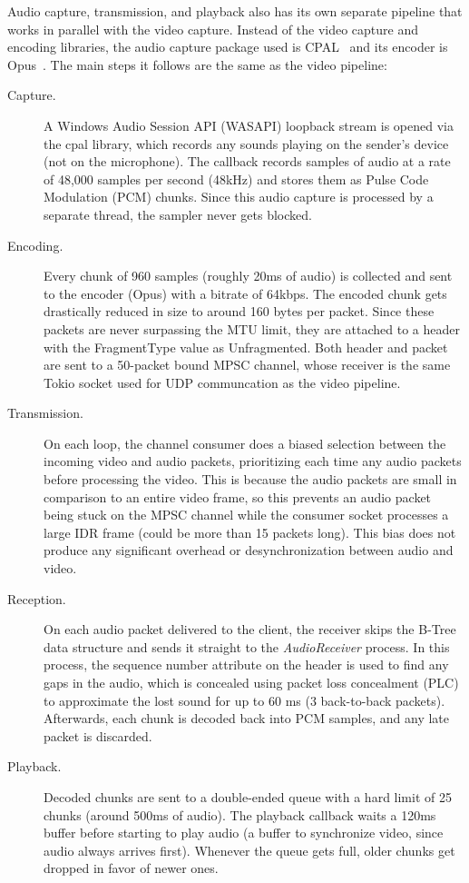 \documentclass{article}
\begin{document}
Audio capture, transmission, and playback also has its own separate pipeline that works in parallel with the video capture. Instead of the video capture and encoding libraries, the audio capture package used is CPAL~\cite{cpal} and its encoder is Opus~\cite{opus_rs}. The main steps it follows are the same as the video pipeline:
\begin{description}
    \item[Capture.] A Windows Audio Session API (WASAPI) loopback stream is opened via the cpal library, which records any sounds playing on the sender's device (not on the microphone). The callback records samples of audio at a rate of 48,000 samples per second (48kHz) and stores them as Pulse Code Modulation (PCM) chunks. Since this 
    audio capture is processed by a separate thread, the sampler never gets blocked.
    \item[Encoding.] Every chunk of 960 samples (roughly 20ms of audio) is collected and sent to the encoder (Opus) with a bitrate of 64kbps. The encoded chunk gets drastically reduced in size to around 160 bytes per packet. Since these packets are never surpassing the MTU limit, they are attached to a header with the FragmentType value as Unfragmented. Both header and packet are sent to a 50-packet bound MPSC channel, whose receiver is the same Tokio socket used for UDP communcation as the video pipeline.
    \item[Transmission.] On each loop, the channel consumer does a biased selection between the incoming video and audio packets, prioritizing each time any audio packets before processing the video. This is because the audio packets are small in comparison to an entire video frame, so this prevents an audio packet being stuck on the MPSC channel while the consumer socket processes a large IDR frame (could be more than 15 packets long). This bias does not produce any significant overhead or desynchronization between audio and video.
    \item[Reception.]  On each audio packet delivered to the client, the receiver skips the B-Tree data structure and sends it straight to the \textit{AudioReceiver} process. In this process, the sequence number attribute on the header is used to find any gaps in the audio, which is concealed using packet loss concealment (PLC) to approximate the lost sound for up to 60 ms (3 back-to-back packets). Afterwards, each chunk is decoded back into PCM samples, and any late packet is discarded.
    \item[Playback.] Decoded chunks are sent to a double-ended queue with a hard limit of 25 chunks (around 500ms of audio). The playback callback waits a 120ms buffer before starting to play audio (a buffer to synchronize video, since audio always arrives first). Whenever the queue gets full, older chunks get dropped in favor of newer ones.
\end{description}
\end{document}
